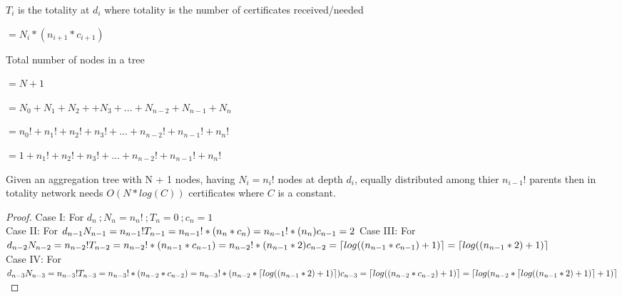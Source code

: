 $T_{i}$ is the totality at $d_{i}$ where totality is the number of certificates received/needed
											
												$= N_{i} * (n_{i+1} * c_{i+1})$

Total number of nodes in a tree  
												
												$= N + 1$
												
												$= N_{0} + N_{1} + N_{2} + + N_{3} + ... + N_{n-2} + N_{n-1} + N_{n}$
												
												$= n_{0}! + n_{1}! + n_{2}! + n_{3}! + ...	+ n_{n-2}!  + n_{n-1}! + n_{n}!$
												
												$= 1 + n_{1}! + n_{2}! + n_{3}! + ...	+ n_{n-2}!  + n_{n-1}! + n_{n}!$

\begin{theorem}
	Given an aggregation tree with N + 1 nodes, having $N_{i} = n_{i}!$ nodes at depth $d_{i}$, equally distributed among thier $n_{i-1}!$ parents then in totality network needs $O(N*log(C))$ certificates where $C$ is a constant.
\end{theorem}

\begin{proof}
	
	Case I: For $d_{n}\ ; N_{n} = n_{n}!\ ; T_{n} = 0\ ; c_{n} = 1 $\\
	Case II: For $d_{n - 1}\\ N_{n - 1} = n_{n - 1}!\\ T_{n - 1} = n_{n - 1}! * (n_{n} * c_{n}) = n_{n - 1}! * (n_{n} )\\ c_{n - 1} = 2\\ $
	Case III: For $d_{n - 2}\\ N_{n - 2} = n_{n - 2}!\\ T_{n -2} = n_{n - 2}! * (n_{n - 1} * c_{n - 1}) = n_{n - 2}! * (n_{n - 1 } * 2) \\ c_{n - 2} = \lceil log((n_{n - 1} *c_{n - 1}) + 1) \rceil = \lceil log((n_{n - 1} * 2) + 1) \rceil $\\
	Case IV: For $d_{n - 3}\\ N_{n - 3} = n_{n - 3}!\\ T_{n -3} = n_{n - 3}! * (n_{n - 2} * c_{n - 2}) = n_{n - 3}! * (n_{n - 2 } * \lceil log((n_{n - 1} * 2 ) + 1) \rceil ) \\ c_{n - 3} = \lceil log((n_{n - 2} * c_{n - 2}) + 1) \rceil = \lceil log( n_{n - 2} *\lceil log((n_{n - 1} * 2 ) + 1) \rceil + 1) \rceil $\\
\end{proof}

